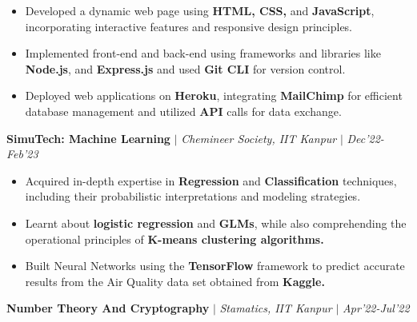 \documentclass[10pt]{extarticle}
\begin{document}
\begin{itemize}

  \item Developed a dynamic web page using \textbf{HTML, CSS,} and \textbf{JavaScript}, incorporating interactive features and responsive design principles.
 
 
  \item Implemented front-end and back-end using frameworks and libraries like \textbf{ Node.js}, and \textbf{Express.js} and used \textbf{Git CLI} for version control.
   \item Deployed web applications on \textbf{Heroku}, integrating \textbf{MailChimp} for efficient database management and utilized \textbf{API} calls for data exchange.
\end{itemize}

\vspace{-4pt}
\begin{tcolorbox}[center, width=20.7cm, colback=black!10]

\textbf{SimuTech: Machine Learning } $|$ \textit{Chemineer Society, IIT Kanpur} $|$ \href{https://github.com/Amber404/ML-CHE}{\faGithub}\textit{}
\hfill\hfill\textcolor{black!70}{\small \textit{Dec'22-Feb'23}}
\end{tcolorbox}
\vspace{-7pt}

\begin{itemize}
  \item Acquired in-depth expertise in \textbf{Regression} and \textbf{Classification} techniques, including their probabilistic interpretations and modeling strategies.
  \item Learnt about \textbf{logistic regression} and \textbf{GLMs}, while also comprehending the operational principles of \textbf{K-means clustering algorithms.}
  \item Built Neural Networks using the \textbf{TensorFlow} framework to predict accurate results from the Air Quality data set obtained from \textbf{Kaggle.}

\end{itemize}

\vspace{-4pt}





\begin{tcolorbox}[center, width=20.7cm, colback=black!10]
\textbf{Number Theory And Cryptography} $|$ \textit{Stamatics, IIT Kanpur} $|$
\href{https://github.com/Amber404/Number-Theory-Cryptography}{\faGithub}\textit{}
\hfill\hfill\textcolor{black!70}{\small \textit{Apr'22-Jul'22}}
\end{tcolorbox}
\end{document}
